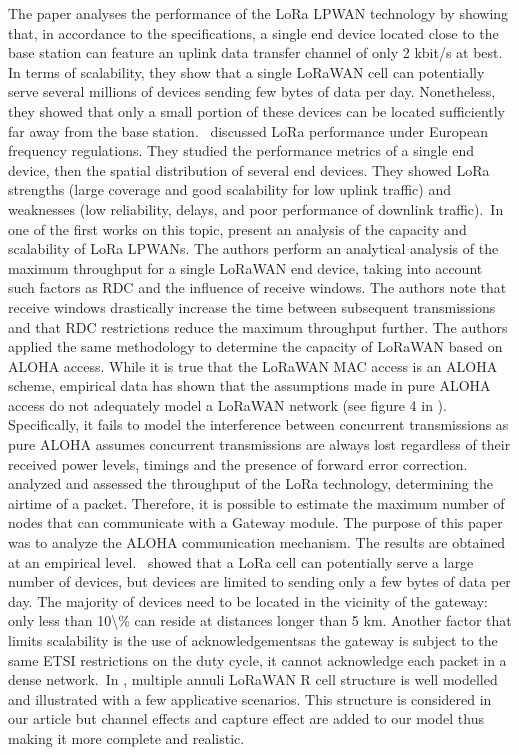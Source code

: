  \cite{mikhaylov_analysis_2016}   The paper \cite{mikhaylov_analysis_2016} analyses the performance of the LoRa LPWAN technology by showing that, in accordance to the specifications, a single end device located close to the base station can feature an uplink data transfer channel of only 2 kbit/s at best. In terms of scalability, they show that a single LoRaWAN cell can potentially serve several millions of devices sending few bytes of data per day. Nonetheless, they showed that only a small portion of these devices can be located sufficiently far away from the base station.~\citet{mikhaylov_analysis_2016} discussed LoRa performance under European frequency regulations. They studied the performance metrics of a single end device, then the spatial distribution of several end devices. They showed LoRa strengths (large coverage and good scalability for low uplink traffic) and weaknesses (low reliability, delays, and poor performance of downlink traffic).~In one of the first works on this topic, \citet{mikhaylov_analysis_2016} present an analysis of the capacity and scalability of LoRa LPWANs. The authors perform an analytical analysis of the maximum throughput for a single LoRaWAN end device, taking into account such factors as RDC and the influence of receive windows. The authors note that receive windows drastically increase the time between subsequent transmissions and that RDC restrictions reduce the maximum throughput further. The authors applied the same methodology to determine the capacity of LoRaWAN based on ALOHA access. While it is true that the LoRaWAN MAC access is an ALOHA scheme, empirical data has shown that the assumptions made in pure ALOHA access do not adequately model a LoRaWAN network (see figure 4 in \cite{bor_lora_2016}). Specifically, it fails to model the interference between concurrent transmissions as pure ALOHA assumes concurrent transmissions are always lost regardless of their received power levels, timings and the presence of forward error correction.~\citet{mikhaylov_analysis_2016} analyzed and assessed the throughput of the LoRa technology, determining the airtime of a packet. Therefore, it is possible to estimate the maximum number of nodes that can communicate with a Gateway module. The purpose of this paper was to analyze the ALOHA communication mechanism. The results are obtained at an empirical level.~\citet{mikhaylov_analysis_2016} showed that a LoRa cell can potentially serve a large number of devices, but devices are limited to sending only a few bytes of data per day. The majority of devices need to be located in the vicinity of the gateway: only less than 10\textbackslash\% can reside at distances longer than 5 km. Another factor that limits scalability is the use of acknowledgements\textemdash{}as the gateway is subject to the same ETSI restrictions on the duty cycle, it cannot acknowledge each packet in a dense network.~In \cite{mikhaylov_analysis_2016}, multiple annuli LoRaWAN R cell structure is well modelled and illustrated with a few applicative scenarios. This structure is considered in our article but channel effects and capture effect are added to our model thus making it more complete and realistic.   \newline 
